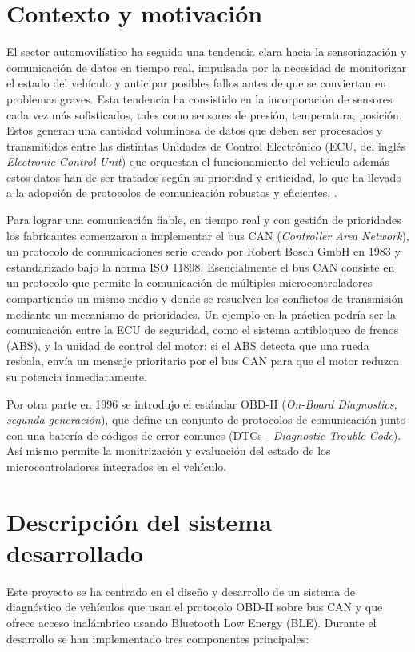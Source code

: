 \section{Contexto y motivación}

El sector automovilístico ha seguido una tendencia clara hacia la sensoriazación y comunicación de datos en tiempo real, impulsada por la necesidad de monitorizar el estado del vehículo y anticipar posibles fallos antes de que se conviertan en problemas graves. Esta tendencia ha consistido en la incorporación de sensores cada vez más sofisticados, tales como sensores de presión, temperatura, posición. Estos generan una cantidad voluminosa de datos que deben ser procesados y transmitidos entre las distintas Unidades de Control Electrónico (ECU, del inglés \textit{Electronic Control Unit}) que orquestan el funcionamiento del vehículo además estos datos han de ser tratados según su prioridad y criticidad, lo que ha llevado a la adopción de protocolos de comunicación robustos y eficientes, .

Para lograr una comunicación fiable, en tiempo real y con gestión de prioridades los fabricantes comenzaron a implementar el bus CAN (\textit{Controller Area Network}), un protocolo de comunicaciones serie creado por Robert Bosch GmbH en 1983 y estandarizado bajo la norma ISO 11898. Esencialmente el bus CAN consiste en un protocolo que permite la comunicación de múltiples microcontroladores compartiendo un mismo medio y donde se resuelven los conflictos de transmisión mediante un mecanismo de prioridades. Un ejemplo en la práctica podría ser la comunicación entre la ECU de seguridad, como el sistema antibloqueo de frenos (ABS), y la unidad de control del motor: si el ABS detecta que una rueda resbala, envía un mensaje prioritario por el bus CAN para que el motor reduzca su potencia inmediatamente.

Por otra parte en 1996 se introdujo el estándar OBD-II (\textit{On-Board Diagnostics, segunda generación}), que define un conjunto de protocolos de comunicación junto con una batería de códigos de error comunes (DTCs - \textit{Diagnostic Trouble Code}). Así mismo permite la monitrización y evaluación del estado de los microcontroladores integrados en el vehículo.

\section{Descripción del sistema desarrollado}

Este proyecto se ha centrado en el diseño y desarrollo de un sistema de diagnóstico de vehículos que usan el protocolo OBD-II sobre bus CAN y que ofrece acceso inalámbrico usando Bluetooth Low Energy (BLE). Durante el desarrollo se han implementado tres componentes principales:

